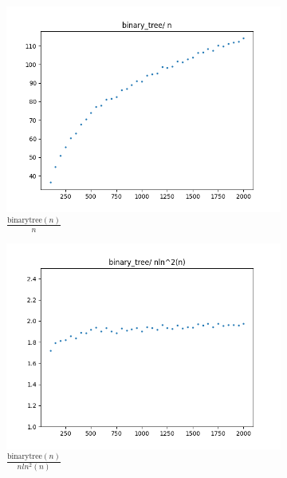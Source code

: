 \documentclass{article}
\begin{document}
\begin{figure}[H]
  \centering
  \begin{subfigure}{.475\textwidth}
    \centering
    \includegraphics[width=\textwidth]{binary_tree_n.png}
    \caption{\( \frac{\text{binarytree}(n)}{n} \)}
    \label{fig:binary_tree_n}
  \end{subfigure}%
  \begin{subfigure}{.475\textwidth}
    \centering
    \includegraphics[width=\textwidth]{binary_tree_nlnnlnn.png}
    \caption{\( \frac{\text{binarytree}(n)}{nln^2(n)} \)}
    \label{fig:binary_tree_nlnn}
  \end{subfigure}%
  \hfill
  \begin{subfigure}{.475\textwidth}

\end{subfigure}
\end{figure}
\end{document}
